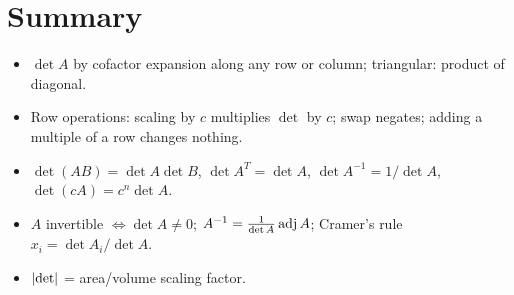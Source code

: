 \section*{Summary}
\begin{itemize}
  \item $\det A$ by cofactor expansion along any row or column; triangular: product of diagonal.
  \item Row operations: scaling by $c$ multiplies $\det$ by $c$; swap negates; adding a multiple of a row
        changes nothing.
  \item $\det(AB)=\det A\det B$, $\det A^T=\det A$, $\det A^{-1}=1/\det A$, $\det(cA)=c^n\det A$.
  \item $A$ invertible $\iff\det A\ne0$; $A^{-1}=\frac{1}{\det A}\operatorname{adj} A$; Cramer's rule
        $x_i=\det A_i/\det A$.
  \item $\left\lvert \det \right\rvert$ = area/volume scaling factor.
\end{itemize}
